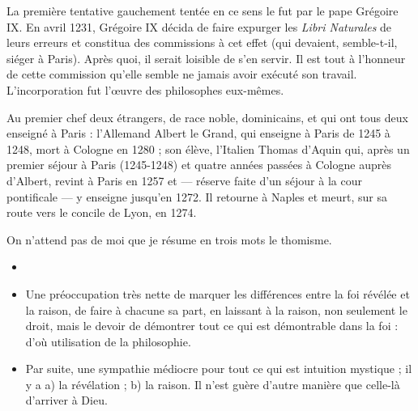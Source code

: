 \documentclass[french,twoside]{book} %
\begin{document}
La première tentative gauchement tentée en ce sens le fut par le pape Grégoire IX. En avril 1231, Grégoire IX décida de faire expurger les {\itshape Libri Naturales} de leurs erreurs et constitua des commissions à cet effet (qui devaient, semble-t-il, siéger à Paris). Après quoi, il serait loisible de s’en servir. Il est tout à l’honneur de cette commission qu’elle semble ne jamais avoir exécuté son travail. L’incorporation fut l’œuvre des philosophes eux-mêmes.\par
Au premier chef deux étrangers, de race noble, dominicains, et qui ont tous deux enseigné à Paris : l’Allemand Albert le Grand, qui enseigne à Paris de 1245 à 1248, mort à Cologne en 1280 ; son élève, l’Italien Thomas d’Aquin qui, après un premier séjour à Paris (1245-1248) et quatre années passées à Cologne auprès d’Albert, revint à Paris en 1257 et — réserve faite d’un séjour à la cour pontificale — y enseigne jusqu’en 1272. Il retourne à Naples et meurt, sur sa route vers le concile de Lyon, en 1274.\par
On n’attend pas de moi que je résume en trois mots le thomisme.\par

\begin{itemize}[itemsep=0pt,]
\item[] \hspace{-1.5em}{\bfseries Ce qu’il faut retenir je crois, surtout, du point de vue qui nous occupe ici, ce sont deux traits :}
\item Une préoccupation très nette de marquer les différences entre la foi révélée et la raison, de faire à chacune sa part, en laissant à la raison, non seulement le droit, mais le devoir de démontrer tout ce qui est démontrable dans la foi : d’où utilisation de la philosophie.
\item Par suite, une sympathie médiocre pour tout ce qui est intuition mystique ; il y a a) la révélation ; b) la raison. Il n’est guère d’autre manière que celle-là d’arriver à Dieu.
\end{itemize}
\end{document}
